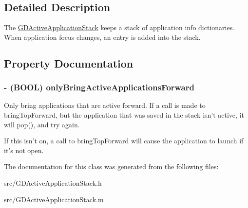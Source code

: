 \subsection{Detailed Description}
The \hyperlink{interface_g_d_active_application_stack}{GDActiveApplicationStack} keeps a stack of application info dictionaries. When application focus changes, an entry is added into the stack. 

\subsection{Property Documentation}
\hypertarget{interface_g_d_active_application_stack_a5714844d3e17a156cca14b1f383b3dbe}{
\subsubsection[{onlyBringActiveApplicationsForward}]{\setlength{\rightskip}{0pt plus 5cm}-\/ (BOOL) onlyBringActiveApplicationsForward}}
\label{interface_g_d_active_application_stack_a5714844d3e17a156cca14b1f383b3dbe}


Only bring applications that are active forward. If a call is made to bringTopForward, but the application that was saved in the stack isn't active, it will pop(), and try again.

If this isn't on, a call to bringTopForward will cause the application to launch if it's not open. 

The documentation for this class was generated from the following files:\begin{DoxyCompactItemize}
\item 
src/GDActiveApplicationStack.h\item 
src/GDActiveApplicationStack.m\end{DoxyCompactItemize}
